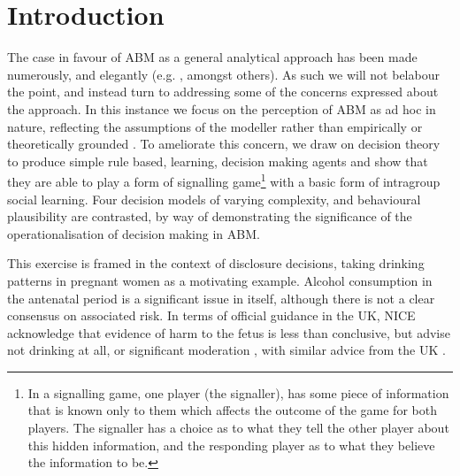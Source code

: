 \section{Introduction}
\label{sec:intro}

The case in favour of \ac{ABM} as a general analytical approach has been made numerously, and elegantly (e.g. \cite{epstein1994growing,Resnick,Axelrod1997,gilbert1999simulation,Macy2002a,Silverman2011,Silverman2013,epstein2014agent_zero}, amongst others). As such we will not belabour the point, and instead turn to addressing some of the concerns expressed about the approach. In this instance we focus on the perception of \ac{ABM} as ad hoc in nature, reflecting the assumptions of the modeller rather than empirically or theoretically grounded \citep{Waldherr2013}. To ameliorate this concern, we draw on decision theory to produce simple rule based, learning, decision making agents and show that they are able to play a form of signalling game\footnote{In a signalling game, one player (the signaller), has some piece of information that is known only to them which affects the outcome of the game for both players. The signaller has a choice as to what they tell the other player about this hidden information, and the responding player as to what they believe the information to be.} \citep{Kreps1987} with a basic form of intragroup social learning. Four decision models of varying complexity, and behavioural plausibility are contrasted, by way of demonstrating the significance of the operationalisation of decision making in \ac{ABM}.

This exercise is framed in the context of disclosure decisions, taking drinking patterns in pregnant women as a motivating example. Alcohol consumption in the antenatal period is a significant issue in itself, although there is not a clear consensus on associated risk. In terms of official guidance in the UK, \ac{NICE} acknowledge that evidence of harm to the fetus is less than conclusive, but advise not drinking at all, or significant moderation \citep{NICE2010a}, with similar advice from the UK \cite{DepartmentofHealth2008}.

